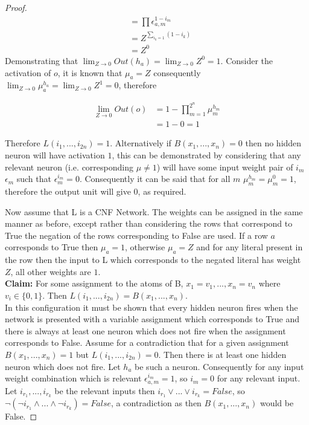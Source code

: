 \begin{proof}
\begin{align*}
&= \prod \epsilon_{a, m}^{1 - i_m}\\
&= Z^{\sum_{i_k = 1}(1 - i_k)}\\
&= Z^0
\end{align*}
Demonstrating that  $\lim_{Z \to 0} Out(h_a) = \lim_{Z \to 0} Z^0 = 1$. Consider the activation of $o$, it is known that $\mu_a = Z$ consequently $\lim_{Z \to 0} \mu_a^{h_a} = \lim_{Z \to 0} Z^1 = 0$, therefore

\begin{align}
\lim_{Z \to 0} Out(o) &= 1 - \prod_{m=1}^{2^n} \mu_m ^{h_m}\\
&= 1 - 0 = 1
\end{align} 

Therefore $L(i_1, ..., i_{2n}) = 1$. Alternatively if $B(x_1, ..., x_n) = 0$ then no hidden neuron will have activation $1$, this can be demonstrated by considering that any relevant neuron (i.e. corresponding $\mu \neq 1$) will have some input weight pair of $i_m$ $\epsilon_m$ such that $\epsilon_m^{i_m} = 0$. Consequently it can be said that for all $m$ $\mu_m^{h_m} = \mu_m^{0} = 1$, therefore the output unit will give $0$, as required.

Now assume that L is a CNF Network. The weights can be assigned in the same manner as before, except rather than considering the rows that correspond to True the negation of the rows corresponding to False are used. If a row $a$ corresponds to True then $\mu_a = 1$, otherwise $\mu_a = Z$ and for any literal present in the row then the input to L which corresponds to the negated literal has weight $Z$, all other weights are $1$.\\

\textbf{Claim:} For some assignment to the atoms of B, $x_1 = v_1, ..., x_n = v_n$ where $v_i \in \{0, 1\}$. Then $L(i_1, ..., i_{2n}) = B(x_1, ..., x_n)$.\\

In this configuration it must be shown that every hidden neuron fires when the network is presented with a variable assignment which corresponds to True and there is always at least one neuron which does not fire when the assignment corresponds to False. Assume for a contradiction that for a given assignment $B(x_1, ..., x_n) = 1$ but $L(i_1, ..., i_{2n}) = 0$. Then there is at least one hidden neuron which does not fire. Let $h_a$ be such a neuron. Consequently for any input weight combination which is relevant $\epsilon_{a,m}^{i_m} = 1$, so $i_m = 0$ for any relevant input. Let $i_{r_1}, ..., i_{r_k}$ be the relevant inputs then $i_{r_1} \lor ... \lor i_{r_k} = False$, so $\lnot(\lnot i_{r_1} \land ... \land \lnot i_{r_k}) = False$, a contradiction as then $B(x_1, ..., x_n)$ would be False.


\end{proof}
